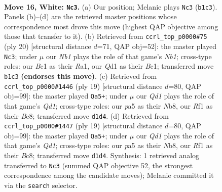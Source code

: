 \documentclass[11pt]{article}
\begin{document}
\clearpage

\begin{figure}[p]\centering
\begin{subfigure}{0.46\textwidth}\centering
\resizebox{\linewidth}{!}{%
\newchessgame
\chessboard[
  setfen={rnbqk2r/8/5np1/ppbp1p2/8/6P1/PP2PPB1/RNBQNRK1 w kq - 0 16},
  showmover=false,
  pgfstyle=straightmove, color=movearrow, markmove={b1-c3}
]}
\caption{}
\end{subfigure}\hfill
\begin{subfigure}{0.46\textwidth}\centering
\resizebox{\linewidth}{!}{%
\newchessgame
\chessboard[
  setfen={r1bqk2r/pp3ppp/3bpn2/8/3P4/6P1/PP3PBP/RNBQ1RK1 w kq - 1 11},
  showmover=false,
  pgfstyle=straightmove, color=movearrow, markmove={b1-c3}
]}
\caption{}
\end{subfigure}
\\[4pt]
\begin{subfigure}{0.46\textwidth}\centering
\resizebox{\linewidth}{!}{%
\newchessgame
\chessboard[
  setfen={rnbq1rk1/pp2ppbp/6p1/8/3PP3/5N2/P3BPPP/1RBQK2R b K - 0 10},
  showmover=false,
  pgfstyle=straightmove, color=movearrow, markmove={d8-a5}
]}
\caption{}
\end{subfigure}\hfill
\begin{subfigure}{0.46\textwidth}\centering
\resizebox{\linewidth}{!}{%
\newchessgame
\chessboard[
  setfen={rnbq1rk1/pp2ppbp/6p1/8/3PP3/5N2/P3BPPP/1RBQK2R b K - 0 10},
  showmover=false,
  pgfstyle=straightmove, color=movearrow, markmove={d8-a5}
]}
\caption{}
\end{subfigure}
\caption{\textbf{Move 16, White: \texttt{Nc3}.} (a) Our position; Melanie plays \texttt{Nc3} (\texttt{b1c3}). Panels (b)--(d) are the retrieved master positions whose correspondence most drove this move (highest QAP objective among those that transfer to it). (b) Retrieved from \texttt{ccrl\_top\_p0000\#75} (ply 20) [structural distance $d$=71, QAP obj=52]: the master played \texttt{Nc3}; under $\mu$ our \emph{Nb1} plays the role of that game's \emph{Nb1}; cross-type roles: our \emph{B}c1 as their \emph{R}a1, our \emph{Q}d1 as their \emph{B}c1; transferred move \texttt{b1c3} \textbf{(endorses this move)}. (c) Retrieved from \texttt{ccrl\_top\_p0000\#1446} (ply 19) [structural distance $d$=80, QAP obj=99]: the master played \texttt{Qa5+}; under $\mu$ our \emph{Qd1} plays the role of that game's \emph{Qd1}; cross-type roles: our \emph{p}a5 as their \emph{N}b8, our \emph{R}f1 as their \emph{B}c8; transferred move \texttt{d1d4}. (d) Retrieved from \texttt{ccrl\_top\_p0000\#1447} (ply 19) [structural distance $d$=80, QAP obj=99]: the master played \texttt{Qa5+}; under $\mu$ our \emph{Qd1} plays the role of that game's \emph{Qd1}; cross-type roles: our \emph{p}a5 as their \emph{N}b8, our \emph{R}f1 as their \emph{B}c8; transferred move \texttt{d1d4}. Synthesis: 1 retrieved analog transferred to \texttt{Nc3} (summed QAP objective 52, the strongest correspondence among the candidate moves); Melanie committed it via the \texttt{search} selector.}
\label{fig:thought-m30}
\end{figure}
\end{document}
